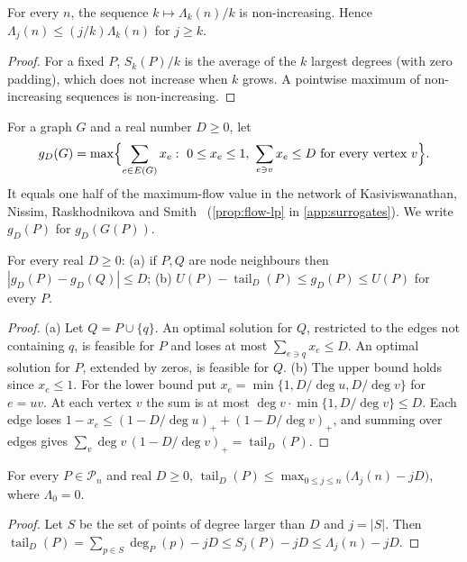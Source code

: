 \documentclass[anonymous,a4paper,USenglish,cleveref,autoref,thm-restate]{socg-lipics-v2021}
\newcommand{\cP}{\mathcal{P}}
\newcommand{\Lam}{\Lambda}
\newcommand{\tail}{\operatorname{tail}}
\begin{document}
\begin{lemma}
\label{lem:average}
For every $n$, the sequence $k\mapsto\Lam_k(n)/k$ is non-increasing. Hence $\Lam_j(n)\le (j/k)\Lam_k(n)$ for $j\ge k$.
\end{lemma}

\begin{proof}
For a fixed $P$, $S_k(P)/k$ is the average of the $k$ largest degrees (with zero padding), which does not increase when $k$ grows. A pointwise maximum of non-increasing sequences is non-increasing.
\end{proof}

For a graph $G$ and a real number $D\ge0$, let
\[
  g_D(G)=\max\Bigl\{\sum_{e\in E(G)}x_e:\ 0\le x_e\le1,\ \sum_{e\ni v}x_e\le D\ \text{for every vertex }v\Bigr\}.
\]
It equals one half of the maximum-flow value in the network of Kasiviswanathan, Nissim, Raskhodnikova and Smith~\cite{KNRS13} (\cref{prop:flow-lp} in \cref{app:surrogates}). We write $g_D(P)$ for $g_D(G(P))$.

\begin{lemma}
\label{lem:surrogate}
For every real $D\ge0$: (a) if $P,Q$ are node neighbours then $|g_D(P)-g_D(Q)|\le D$; (b) $U(P)-\tail_D(P)\le g_D(P)\le U(P)$ for every $P$.
\end{lemma}

\begin{proof}
(a) Let $Q=P\cup\{q\}$. An optimal solution for $Q$, restricted to the edges not containing $q$, is feasible for $P$ and loses at most $\sum_{e\ni q}x_e\le D$. An optimal solution for $P$, extended by zeros, is feasible for $Q$. (b) The upper bound holds since $x_e\le1$. For the lower bound put $x_e=\min\{1,D/\deg u,D/\deg v\}$ for $e=uv$. At each vertex $v$ the sum is at most $\deg v\cdot\min\{1,D/\deg v\}\le D$. Each edge loses $1-x_e\le(1-D/\deg u)_++(1-D/\deg v)_+$, and summing over edges gives $\sum_v\deg v\,(1-D/\deg v)_+=\tail_D(P)$.
\end{proof}

\begin{lemma}
\label{lem:tail}
For every $P\in\cP_n$ and real $D\ge0$, $\tail_D(P)\le\max_{0\le j\le n}\bigl(\Lam_j(n)-jD\bigr)$, where $\Lam_0=0$.
\end{lemma}

\begin{proof}
Let $S$ be the set of points of degree larger than $D$ and $j=|S|$. Then $\tail_D(P)=\sum_{p\in S}\deg_P(p)-jD\le S_j(P)-jD\le\Lam_j(n)-jD$.
\end{proof}
\end{document}
